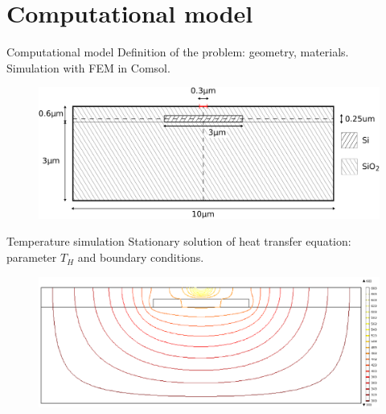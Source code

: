 \documentclass[11pt, leqno]{beamer}
\begin{document}
\section{Computational model}
\begin{frame}{Computational model}
	Definition of the problem: geometry, materials.\\
	Simulation with FEM in Comsol.
	\begin{figure}
		\centering
		\includegraphics[width=\textwidth]{geometryR.pdf}
	\end{figure}
\end{frame}
\begin{frame}{Temperature simulation}
	Stationary solution of heat transfer equation:\\
	parameter $T_H$ and boundary conditions.
	\begin{figure}
		\centering
		\includegraphics[width=\textwidth]{thermal.pdf}
	\end{figure}
\end{frame}
\end{document}
